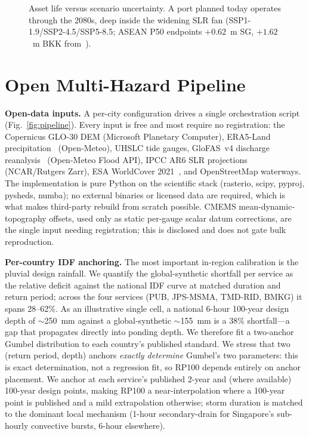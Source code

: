 \documentclass[conference]{IEEEtran}
\begin{document}
\begin{figure}[t]
\centering
\caption{Asset life versus scenario uncertainty. A port planned today operates through the 2080s, deep inside the widening SLR fan (SSP1-1.9/SSP2-4.5/SSP5-8.5; ASEAN P50 endpoints $+0.62$~m SG, $+1.62$~m BKK from~\cite{ar6}).}
\label{fig:assetlife}
\end{figure}

\section{Open Multi-Hazard Pipeline}
\textbf{Open-data inputs.} A per-city configuration drives a single orchestration script (Fig.~\ref{fig:pipeline}). Every input is free and most require no registration: the Copernicus GLO-30 DEM (Microsoft Planetary Computer), ERA5-Land precipitation~\cite{era5land} (Open-Meteo), UHSLC tide gauges, GloFAS~v4 discharge reanalysis~\cite{glofas} (Open-Meteo Flood API), IPCC AR6 SLR projections~\cite{ar6} (NCAR/Rutgers Zarr), ESA WorldCover 2021~\cite{worldcover}, and OpenStreetMap waterways. The implementation is pure Python on the scientific stack (rasterio, scipy, pyproj, pysheds, numba); no external binaries or licensed data are required, which is what makes third-party rebuild from scratch possible. CMEMS mean-dynamic-topography offsets, used only as static per-gauge scalar datum corrections, are the single input needing registration; this is disclosed and does not gate bulk reproduction.

\textbf{Per-country IDF anchoring.} The most important in-region calibration is the pluvial design rainfall. We quantify the global-synthetic shortfall per service as the relative deficit against the national IDF curve at matched duration and return period; across the four services (PUB, JPS-MSMA, TMD-RID, BMKG) it spans 28--62\%. As an illustrative single cell, a national 6-hour 100-year design depth of $\sim$250~mm against a global-synthetic $\sim$155~mm is a 38\% shortfall---a gap that propagates directly into ponding depth. We therefore fit a two-anchor Gumbel distribution to each country's published standard. We stress that two (return period, depth) anchors \emph{exactly determine} Gumbel's two parameters: this is exact determination, not a regression fit, so RP100 depends entirely on anchor placement. We anchor at each service's published 2-year and (where available) 100-year design points, making RP100 a near-interpolation where a 100-year point is published and a mild extrapolation otherwise; storm duration is matched to the dominant local mechanism (1-hour secondary-drain for Singapore's sub-hourly convective bursts, 6-hour elsewhere).
\end{document}
